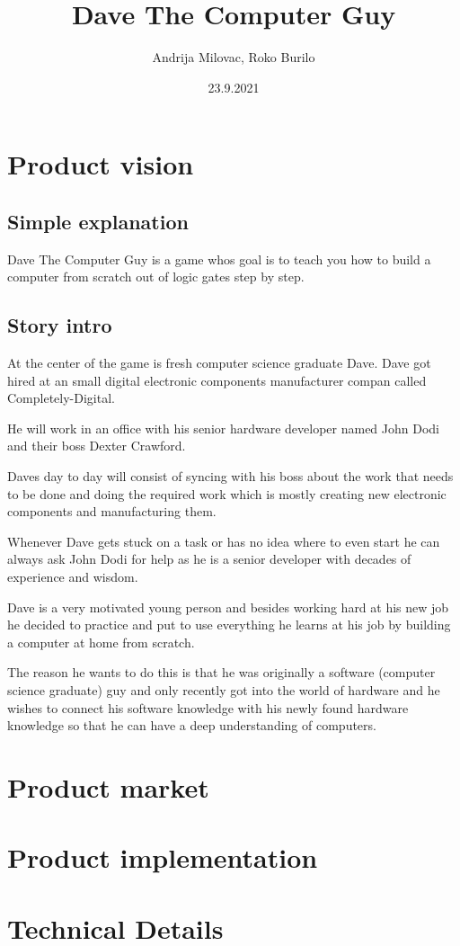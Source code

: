 \documentclass[12pt]{article}
\author{Andrija Milovac, Roko Burilo}
\title{Dave The Computer Guy}
\date{23.9.2021}
\begin{document}
\maketitle
\tableofcontents
\section{Product vision}
\subsection{Simple explanation}
Dave The Computer Guy is a game whos goal is to teach you how to build a computer from scratch out of logic gates step by step.
\subsection{Story intro}
At the center of the game is fresh computer science graduate Dave.
Dave got hired at an small digital electronic components manufacturer compan called Completely-Digital.

He will work in an office with his senior hardware developer named John Dodi and their boss Dexter Crawford.

Daves day to day will consist of syncing with his boss about the work that needs to be done and doing the required work which is mostly
creating new electronic components and manufacturing them.

Whenever Dave gets stuck on a task or has no idea where to even start he can always ask John Dodi for help as he is a senior developer with 
decades of experience and wisdom.

Dave is a very motivated young person and besides working hard at his new job he decided to practice and put to use everything he learns 
at his job by building a computer at home from scratch.

The reason he wants to do this is that he was originally a software (computer science graduate) guy and only recently got into the world of hardware and he 
wishes to connect his software knowledge with his newly found hardware knowledge so that he can have a deep understanding of computers.






\section{Product market}
\section{Product implementation}
\section{Technical Details}
\end{document}
